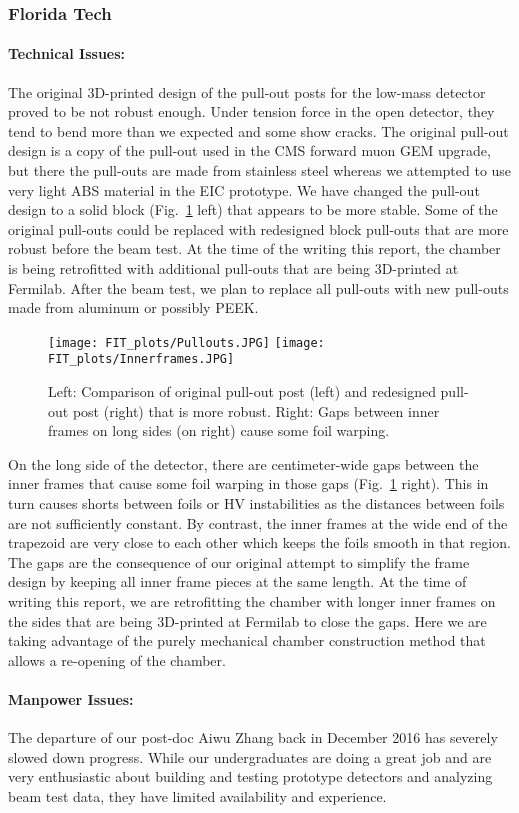\subsubsection{Florida Tech} 

\paragraph*{Technical Issues:} The original 3D-printed design of the pull-out posts for the low-mass detector proved to be not robust enough. Under tension force in the open detector, they tend to bend more than we expected and some show cracks. The original pull-out design is a copy of the pull-out used in the CMS forward muon GEM upgrade, but there the pull-outs are made from stainless steel whereas we attempted to use very light ABS material in the EIC prototype. We have changed the pull-out design to a solid block (Fig.~\ref{fig:Pullouts} left) that appears to be more stable. Some of the original pull-outs could be replaced with redesigned block pull-outs that are more robust before the beam test. At the time of the writing this report, the chamber is being retrofitted with additional pull-outs that are being 3D-printed at Fermilab. After the beam test, we plan to replace all pull-outs with new pull-outs made from aluminum or possibly PEEK.

\begin{figure}
	\centering
		\texttt{[image: FIT\_plots/Pullouts.JPG]}
		\texttt{[image: FIT\_plots/Innerframes.JPG]}
	\caption{\label{fig:Pullouts}Left: Comparison of original pull-out post (left) and redesigned pull-out post (right) that is more robust. Right: Gaps between inner frames on long sides (on right) cause some foil warping.}	
\end{figure}

On the long side of the detector, there are centimeter-wide gaps between the inner frames that cause some foil warping in those gaps (Fig.~\ref{fig:Pullouts} right). This in turn causes shorts between foils or HV instabilities as the distances between foils are not sufficiently constant. By contrast, the inner frames at the wide end of the trapezoid are very close to each other which keeps the foils smooth in that region. The gaps are the consequence of our original attempt to simplify the frame design by keeping all inner frame pieces at the same length. At the time of writing this report, we are retrofitting the chamber with longer inner frames on the sides that are being 3D-printed at Fermilab to close the gaps. Here we are taking advantage of the purely mechanical chamber construction method that allows a re-opening of the chamber.

\paragraph*{Manpower Issues:} The departure of our post-doc Aiwu Zhang back in December 2016 has severely slowed down progress. While our undergraduates are doing a great job and are very enthusiastic about building and testing prototype detectors and analyzing beam test data, they have limited availability and experience.